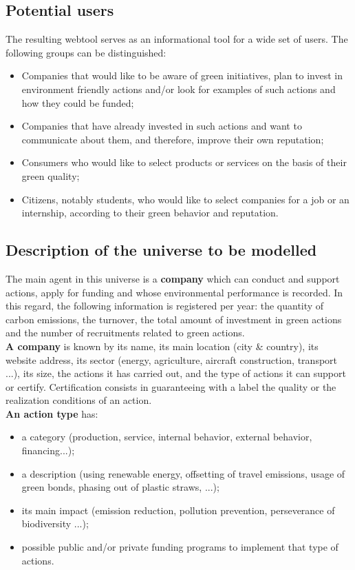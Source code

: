 \subsection{Potential users}
The resulting webtool serves as an informational tool for a wide set of users.
The following groups can be distinguished:
\begin{itemize}
    \item Companies that would like to be aware of green initiatives, plan to invest in environment friendly actions and/or look for examples of such actions and how they could be funded;
    \item Companies that have already invested in such actions and want to communicate about them, and therefore, improve their own reputation;
    \item Consumers who would like to select products or services on the basis of their green quality;
    \item Citizens, notably students, who would like to select companies for a job or an internship, according to their green behavior and reputation.
\end{itemize}

\subsection{Description of the universe to be modelled}

The main agent in this universe is a \textbf{company} which can conduct and support actions, apply for funding and whose
environmental performance is recorded.
In this regard, the following information is registered per year: the quantity of carbon emissions, the turnover, the total amount of
investment in green actions and the number of recruitments related to green actions. \\

\textbf{A company} is known by its name, its main location (city \& country), its website address, its sector (energy, agriculture,
aircraft construction, transport ...), its size, the actions it has carried out, and the type of actions it can support or certify.
Certification consists in guaranteeing with a label the quality or the realization conditions of an action. \\

\textbf{An action type} has:
\begin{itemize}
    \item a category (production, service, internal behavior, external behavior, financing...);
    \item a description (using renewable energy, offsetting of travel emissions, usage of green bonds, phasing out
    of plastic straws, ...);
    \item its main impact (emission reduction, pollution prevention, perseverance of biodiversity ...);
    \item possible public and/or private funding programs to implement that type of actions.
\end{itemize}

